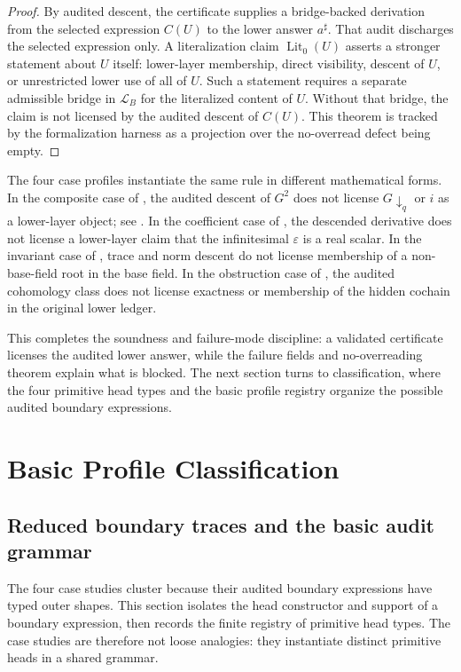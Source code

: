 \documentclass[11pt]{article}
\newcommand{\Lit}{\operatorname{Lit}}
\theoremstyle{definition}
\begin{document}
\begin{proof}
By audited descent, the certificate supplies a bridge-backed derivation from the
selected expression \(C(U)\) to the lower answer \(a^\sharp\).  That audit
discharges the selected expression only.  A literalization claim
\(\Lit_0(U)\) asserts a stronger statement about \(U\) itself: lower-layer
membership, direct visibility, descent of \(U\), or unrestricted lower use of
all of \(U\).  Such a statement requires a separate admissible bridge in
\(\mathcal L_B\) for the literalized content of \(U\).  Without that bridge, the
claim is not licensed by the audited descent of \(C(U)\).  This theorem is
tracked by the formalization harness as a projection over the no-overread defect
being empty.
\end{proof}

The four case profiles instantiate the same rule in different mathematical
forms.  In the composite case of , the audited descent of
\(G^2\) does not license \(G\downarrow_q\) or \(i\) as a lower-layer object; see
.  In the coefficient case of
, the descended derivative does not license a lower-layer
claim that the infinitesimal \(\varepsilon\) is a real scalar.  In the invariant
case of , trace and norm descent do not license membership of
a non-base-field root in the base field.  In the obstruction case of
, the audited cohomology class does not license exactness
or membership of the hidden cochain in the original lower ledger.

This completes the soundness and failure-mode discipline: a validated
certificate licenses the audited lower answer, while the failure fields and
no-overreading theorem explain what is blocked.  The next section turns to
classification, where the four primitive head types and the basic profile
registry organize the possible audited boundary expressions.
 \section{Basic Profile Classification}\label{sec:classification}

\subsection{Reduced boundary traces and the basic audit grammar}
\label{subsec:classification-reduced-grammar}

The four case studies cluster because their audited boundary expressions have
typed outer shapes.  This section isolates the head constructor and support of a
boundary expression, then records the finite registry of primitive head types.
The case studies are therefore not loose analogies: they instantiate distinct
primitive heads in a shared grammar.
\end{document}
